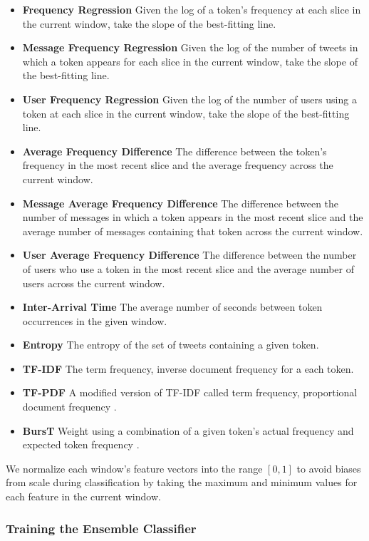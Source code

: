 \documentclass{sig-alternate}
\begin{document}
\begin{itemize}
\item \textbf{Frequency Regression} Given the log of a token's frequency at each slice in the current window, take the slope of the best-fitting line.
\item \textbf{Message Frequency Regression} Given the log of the number of tweets in which a token appears for each slice in the current window, take the slope of the best-fitting line.
\item \textbf{User Frequency Regression} Given the log of the number of users using a token at each slice in the current window, take the slope of the best-fitting line.
\item \textbf{Average Frequency Difference} The difference between the token's frequency in the most recent slice and the average frequency across the current window.
\item \textbf{Message Average Frequency Difference} The difference between the number of messages in which a token appears in the most recent slice and the average number of messages containing that token across the current window.
\item \textbf{User Average Frequency Difference} The difference between the number of users who use a token in the most recent slice and the average number of users across the current window.
\item \textbf{Inter-Arrival Time} The average number of seconds between token occurrences in the given window.
\item \textbf{Entropy} The entropy of the set of tweets containing a given token.
\item \textbf{TF-IDF} The term frequency, inverse document frequency for a each token.
\item \textbf{TF-PDF} A modified version of TF-IDF called term frequency, proportional document frequency \cite{Bun:2002:TEN:645962.674082}.
\item \textbf{BursT} Weight using a combination of a given token's actual frequency and expected token frequency \cite{Lee:2011:BDT:2009463.2009531}.
\end{itemize}

We normalize each window's feature vectors into the range $[0, 1]$ to avoid biases from scale during classification by taking the maximum and minimum values for each feature in the current window.

\subsubsection{Training the Ensemble Classifier}
\end{document}
